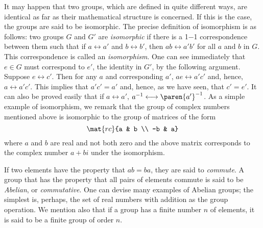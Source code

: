 It may happen that two groups, which are defined in quite different ways, are identical as far as their mathematical structure is concerned. If this is the case, the groups are said to be isomorphic. The precise definition of isomorphism is as follows: two groups $G$ and $G'$ are \emph{isomorphic} if there is a 1$-$1 correspondence between them such that if $a \longleftrightarrow a'$ and $b \longleftrightarrow b'$, then $ab \longleftrightarrow a'b'$ for all $a$ and $b$ in $G$. This correspondence is called an \emph{isomorphism}. One can see immediately that $e \in G$ must correspond to $e'$, the identity in $G'$, by the following argument. Suppose $e \longleftrightarrow c'$. Then for any $a$ and corresponding $a'$, $ae \longleftrightarrow a'c'$ and, hence, $a \longleftrightarrow a'c'$. This implies that $a'c' = a'$ and, hence, as we have seen, that $c' = e'$. It can also be proved easily that if $a \longleftrightarrow a'$, $a^{-1} \longleftrightarrow \paren{a'}^{-1}$. As a simple example of isomorphism, we remark that the group of complex numbers mentioned above is isomorphic to the group of matrices of the form
\begin{equation*}
  \mat{rc}{a & b \\ -b & a}
\end{equation*}
where $a$ and $b$ are real and not both zero and the above matrix corresponds to the complex number $a + bi$ under the isomorphism.

If two elements have the property that $ab = ba$, they are said to \emph{commute}. A group that has the property that all pairs of elements commute is said to be \emph{Abelian}, or \emph{commutative}. One can devise many examples of Abelian groups; the simplest is, perhaps, the set of real numbers with addition as the group operation. We mention also that if a group has a finite number $n$ of elements, it is said to be a finite group of order $n$.

\endinput